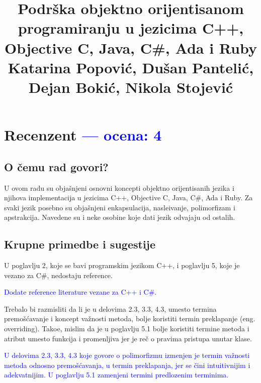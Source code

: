 \documentclass[a4paper]{report}
\newcommand{\odgovor}[1]{\textcolor{blue}{#1}}
\begin{document}
\title{ Podrška objektno orijentisanom programiranju u jezicima C++, Objective C, Java, C\#, Ada i Ruby\\ \small{Katarina Popović, Dušan Pantelić, Dejan Bokić, Nikola Stojević}}

\maketitle

\tableofcontents

\chapter{Recenzent \odgovor{--- ocena: 4} }


\section{O čemu rad govori?}
U ovom radu su obja\v snjeni osnovni koncepti objektno orijentisanih jezika i njihova implementacija u jezicima C++, Objective C, Java, C\#, Ada i Ruby.
Za svaki jezik posebno su obja\v snjeni enkapsulacija, nasle\dj{}ivanje, polimorfizam i apstrakcija. Navedene su i neke osobine koje dati jezik odvajaju od ostalih.
\section{Krupne primedbe i sugestije}
U poglavlju 2, koje se bavi programskim jezikom C++, i poglavlju 5, koje je vezano za C\#, nedostaju reference. 

\odgovor{
Dodate reference literature vezane za C++ i C\#.}

Trebalo bi razmisliti da li je u delovima 2.3, 3.3, 4.3,  umesto termina premo\v s\'cavanje i koncept va\v znosti metoda, bolje koristiti termin preklapanje (eng. overriding). Tako\dj{}e, mislim da je u poglavlju 5.1 bolje koristiti termine metoda i atribut  umesto funkcija i promenljiva jer je re\v c o pravima pristupa unutar klase.

\odgovor{
U delovima 2.3, 3.3, 4.3 koje govore o polimorfizmu izmenjen je termin važnosti metoda odnosno premošćavanja, u termin preklapanja, jer se čini intuitivnijim i adekvatnijim. U poglavlju 5.1 zamenjeni termini predlozenim terminima.}
\end{document}
